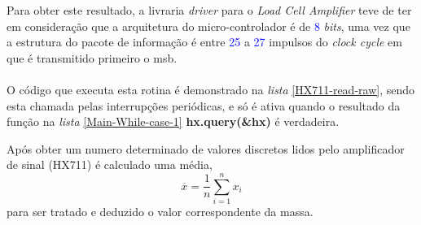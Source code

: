 Para obter este resultado, a livraria \textit{driver} para o \textit{Load Cell Amplifier} teve de ter em consideração que a arquitetura do micro-controlador é de \textcolor{blue}{8} \textit{bits}, uma vez que a estrutura do pacote de informação é entre \textcolor{blue}{25} a \textcolor{blue}{27} impulsos do \textit{clock cycle} em que é transmitido primeiro o \ac{msb}.
\\
\\
O código que executa esta rotina é demonstrado na \textit{lista} \ref{HX711-read-raw}, sendo esta chamada pelas interrupções periódicas, e só é ativa quando o resultado da função na \textit{lista} \ref{Main-While-case-1} \textbf{hx.query(\&hx)} é verdadeira.
{
	
}
\newpage
{
	
}
Após obter um numero determinado de valores discretos lidos pelo amplificador de sinal (HX711) é calculado uma média,
\begin{equation}
	\label{eq:Mean}
	\overline{x}  =  \frac{1}{n}\sum_{i=1}^n x_i
\end{equation}
para ser tratado e deduzido o valor correspondente da massa.
\newpage
